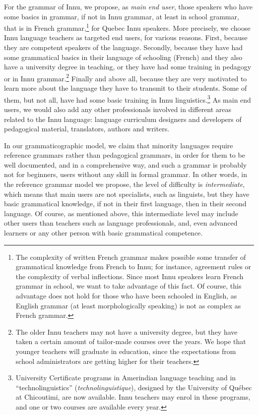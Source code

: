 For the grammar of Innu, we propose, as \textit{main}\textit{ end user}, those speakers who have some basics in grammar, if not in Innu grammar, at least in school grammar, that is in French grammar,\footnote{The
 complexity of written French grammar makes possible some transfer of grammatical knowledge from French to Innu; for instance, agreement rules or the complexity of verbal inflections. Since most Innu speakers learn French grammar in school, we want to take advantage of this fact. Of course, this advantage does not hold for those who have been schooled in English, as English grammar (at least morphologically speaking) is not as complex as French grammar.
}
for Quebec Innu speakers. More precisely, we choose Innu language teachers as targeted end users, for various reasons. First, because they are competent speakers of the language. Secondly, because they have had some grammatical basics in their language of schooling (French) and they also have a university degree in teaching, or they have had some training in pedagogy or in Innu grammar.\footnote{The
 older Innu teachers may not have a university degree, but they have taken a certain amount of tailor-made courses over the years. We hope that younger teachers will graduate in education, since the expectations from school administrators are getting higher for their teachers.
}
Finally and above all, because they are very motivated to learn more about the language they have to transmit to their students. Some of them, but not all, have had some basic training in Innu linguistics.\footnote{University
 Certificate programs in Amerindian language teaching and in ``technolinguistics'' (\textit{technolinguistique}), designed by the University of Québec at Chicoutimi, are now available. Innu teachers may enrol in these programs, and one or two courses are available every year. 
} 
As main end users, we would also add any other professionals involved in different areas related to the Innu language: language curriculum designers and developers of pedagogical material, translators, authors and writers.

In our grammaticographic model, we claim that minority languages require reference grammars rather than pedagogical grammars, in order for them to be well documented, and in a comprehensive way, and such a grammar is probably not for beginners, users without any skill in formal grammar. In other words, in the reference grammar model we propose, the level of difficulty is \textit{intermediate}, which means that main users are not specialists, such as linguists, but they have basic grammatical knowledge, if not in their first language, then in their second language. Of course, as mentioned above, this intermediate level may include other users than teachers such as language professionals, and, even advanced learners or any other person with basic grammatical competence.

